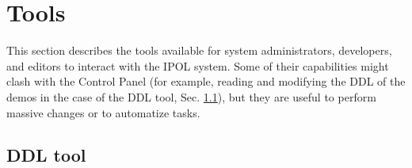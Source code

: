 \section{Tools}
This section describes the tools available for system administrators, developers, and editors to interact with the IPOL system. Some of their capabilities might clash with the Control Panel (for example, reading and modifying the DDL of the demos in the case of the DDL tool, Sec. \ref{sec:ddl_tool}), but they are useful to perform massive changes or to automatize tasks.


\subsection{DDL tool}
\label{sec:ddl_tool}
